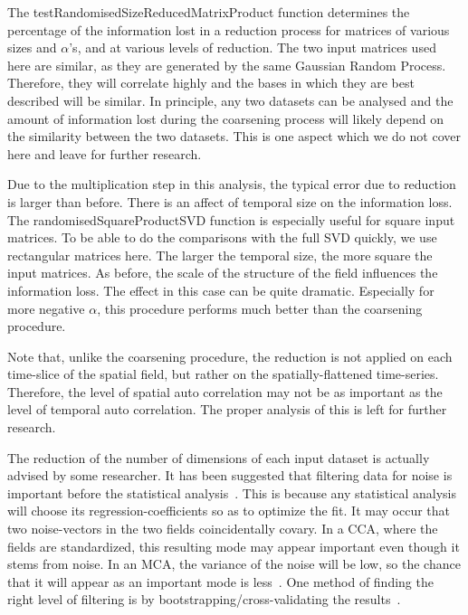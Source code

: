 \documentclass{acm_proc_article-sp}
\begin{document}
The testRandomisedSizeReducedMatrixProduct function determines the percentage of the information lost in a reduction process for matrices of various sizes and $\alpha$'s, and at various levels of reduction. The two input matrices used here are similar, as they are generated by the same Gaussian Random Process. Therefore, they will correlate highly and the bases in which they are best described will be similar. In principle, any two datasets can be analysed and the amount of information lost during the coarsening process will likely depend on the similarity between the two datasets. This is one aspect which we do not cover here and leave for further research.

Due to the multiplication step in this analysis, the typical error due to reduction is larger than before. There is an affect of temporal size on the information loss. The randomisedSquareProductSVD function is especially useful for square input matrices. To be able to do the comparisons with the full SVD quickly, we use rectangular matrices here. The larger the temporal size, the more square the input matrices. As before, the scale of the structure of the field influences the information loss. The effect in this case can be quite dramatic. Especially for more negative $\alpha$, this procedure performs much better than the coarsening procedure.

Note that, unlike the coarsening procedure, the reduction is not applied on each time-slice of the spatial field, but rather on the spatially-flattened time-series. Therefore, the level of spatial auto correlation may not be as important as the level of temporal auto correlation. The proper analysis of this is left for further research.

The reduction of the number of dimensions of each input dataset is actually advised by some researcher. It has been suggested that filtering data for noise is important before the statistical analysis~\cite{Barnett1987}. This is because any statistical analysis will choose its regression-coefficients so as to optimize the fit. It may occur that two noise-vectors in the two fields coincidentally covary. In a CCA, where the fields are standardized, this resulting mode may appear important even though it stems from noise. In an MCA, the variance of the noise will be low, so the chance that it will appear as an important mode is less~\cite{Bretherton1992}. One method of finding the right level of filtering is by bootstrapping/cross-validating the results~\cite{Livezey1999}.
\end{document}
